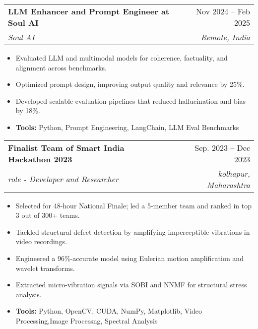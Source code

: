 \documentclass[letterpaper,11pt]{article}
\makeatletter
\newcommand{\resumeItem}[1]{
  \item\small{
    {#1 \vspace{-2pt}}
  }
}
\newcommand{\resumeSubheading}[4]{
  \vspace{-2pt}\item
    \begin{tabular*}{0.97\textwidth}[t]{l@{\extracolsep{\fill}}r}
      \textbf{#1} & #2 \\
      \textit{\small#3} & \textit{\small #4} \\
    \end{tabular*}\vspace{-7pt}
}
\newcommand{\resumeSubSubheading}[2]{
    \item
    \begin{tabular*}{0.97\textwidth}{l@{\extracolsep{\fill}}r}
      \textit{\small#1} & \textit{\small #2} \\
    \end{tabular*}\vspace{-7pt}
}
\newcommand{\resumeSubHeadingListEnd}{\end{itemize}}
\newcommand{\resumeItemListStart}{\begin{itemize}}
\newcommand{\resumeItemListEnd}{\end{itemize}\vspace{-5pt}}
\makeatother
\begin{document}
    \resumeSubheading
      {LLM Enhancer and Prompt Engineer at Soul AI}{Nov 2024 -- Feb 2025}
      {Soul AI}{Remote, India}
      \resumeItemListStart
        \resumeItem{ Evaluated LLM and multimodal models for coherence, factuality, and alignment across benchmarks.  }
        \resumeItem{Optimized prompt design, improving output quality and relevance by 25\%.}
        \resumeItem{Developed scalable evaluation pipelines that reduced hallucination and bias by 18\%.}
        \resumeItem{\textbf{Tools:} Python, Prompt Engineering, LangChain, LLM Eval Benchmarks}
      \resumeItemListEnd
      

          
    \resumeSubheading
      {Finalist Team of Smart India Hackathon 2023}{Sep. 2023 -- Dec 2023}
      {role - Developer and Researcher}{kolhapur, Maharashtra}
      \resumeItemListStart
        \resumeItem{Selected for 48-hour National Finale; led a 5-member team and ranked in top 3 out of 300+ teams.}
        \resumeItem{Tackled structural defect detection by amplifying imperceptible vibrations in video recordings.}
        \resumeItem{Engineered a 96\%-accurate model using Eulerian motion amplification and wavelet transforms.}
        \resumeItem{Extracted micro-vibration signals via SOBI and NNMF for structural stress analysis.}
        \resumeItem{\textbf{Tools:} Python, OpenCV, CUDA, NumPy, Matplotlib, Video Processing,Image Processng, Spectral Analysis}
    \resumeItemListEnd
\end{document}
